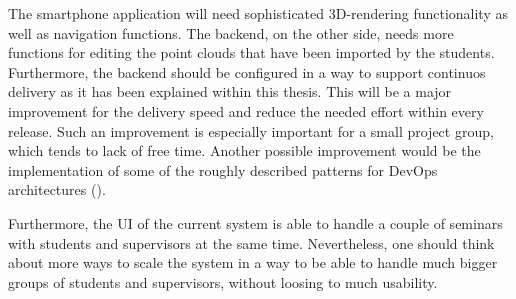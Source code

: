 The smartphone application will need sophisticated 3D-rendering functionality as well as navigation functions. The backend, on the other side, needs more functions for editing the point clouds that have been imported by the students. Furthermore, the backend should be configured in a way to support continuos delivery as it has been explained within this thesis. This will be a major improvement for the delivery speed and reduce the needed effort within every release. Such an improvement is especially important for a small project group, which tends to lack of free time. Another possible improvement would be the implementation of some of the roughly described patterns for DevOps architectures (\cite{cukier2013devops}).

Furthermore, the \ac{UI} of the current system is able to handle a couple of seminars with students and supervisors at the same time. Nevertheless, one should think about more ways to scale the system in a way to be able to handle much bigger groups of students and supervisors, without loosing to much usability.  

